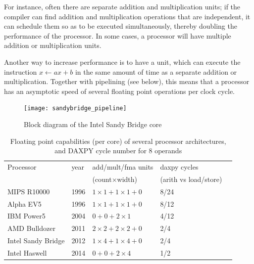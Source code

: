 For instance, often there are separate addition and
multiplication units; if the compiler can find addition and
multiplication operations that are independent, it can schedule them
so as to be executed simultaneously, thereby doubling the performance
of the processor. In some cases, a processor will have multiple
addition or multiplication units.

Another way to increase performance is to have a 
unit, which can execute the instruction $x\leftarrow ax+b$ in the same
amount of time as a separate addition or multiplication. Together with
pipelining (see below), this means that a processor has an asymptotic
speed of several floating point operations per clock cycle.

\begin{figure}[ht]
  \texttt{[image: sandybridge\_pipeline]}
  \caption{Block diagram of the Intel Sandy Bridge core}
  \label{fig:sandycore}
\end{figure}

\begin{table}[h]
  \centering
  \begin{tabular}{p{2in}llll}
Processor&year&add/mult/fma units  &daxpy cycles\\
         &    &(count$\times$width)&(arith vs load/store)\\
\hline
MIPS R10000       &1996 &$1\times1+1\times1+0$ &8/24 \\
Alpha EV5         &1996 &$1\times1+1\times1+0$ &8/12 \\
IBM Power5        &2004 &$0+0+2\times1       $ &4/12 \\
AMD Bulldozer     &2011 &$2\times2+2\times2+0$ &2/4  \\
Intel Sandy Bridge&2012 &$1\times4+1\times4+0$ &2/4  \\
Intel Haswell     &2014 &$0+0+2\times 4      $ &1/2  \\
  \end{tabular}
  \caption{Floating point capabilities (per core) of several processor architectures,
  and DAXPY cycle number for 8 operands}
  \label{tab:chipfloats}
\end{table}

